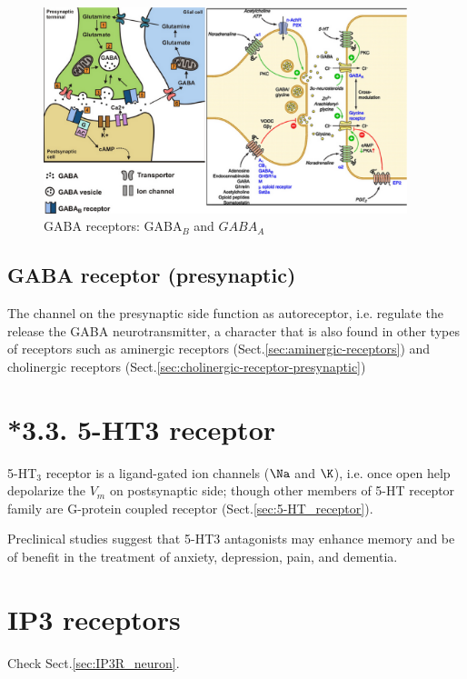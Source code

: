 \begin{figure}[hbt]
  \centerline{\includegraphics[height=6cm,
    angle=0]{./images/GABA_receptors.eps}}
  \caption{GABA receptors: GABA$_B$ and $GABA_A$}
  \label{fig:GABA_receptor}
\end{figure}

\subsection{GABA receptor (presynaptic)}
\label{sec:GABA-receptor-presynaptic}

The channel on the presynaptic side function as autoreceptor, i.e.
regulate the release the GABA neurotransmitter, a character that is also found
in other types of receptors such as aminergic receptors
(Sect.\ref{sec:aminergic-receptors}) and cholinergic receptors
(Sect.\ref{sec:cholinergic-receptor-presynaptic})
  



\section{*3.3. 5-HT3 receptor}
\label{sec:5-HT3-receptor}

5-HT$_3$ receptor is a ligand-gated ion channels ($\Na$ and $\K$), i.e.
once open help depolarize the $V_m$ on postsynaptic side; though other members
of 5-HT receptor family are G-protein coupled receptor
(Sect.\ref{sec:5-HT_receptor}).
  
Preclinical studies suggest that 5-HT3 antagonists may enhance memory and be of
benefit in the treatment of anxiety, depression, pain, and dementia.
  

\section{IP3 receptors}

Check Sect.\ref{sec:IP3R_neuron}. 


